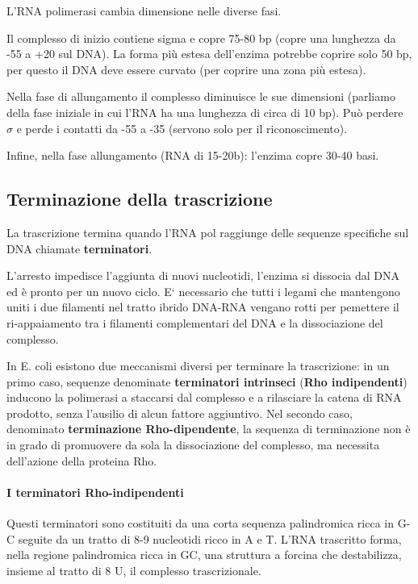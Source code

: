 \documentclass[11pt]{book}
\begin{document}
L'RNA polimerasi cambia dimensione nelle diverse fasi.

Il complesso di inizio contiene sigma e copre 75-80 bp (copre una
lunghezza da -55 a +20 sul DNA). La forma più estesa dell'enzima
potrebbe coprire solo 50 bp, per questo il DNA deve essere curvato (per
coprire una zona più estesa).

Nella fase di allungamento il complesso diminuisce le sue dimensioni
(parliamo della fase iniziale in cui l'RNA ha una lunghezza di circa di
10 bp). Può perdere \(\sigma\) e perde i contatti da -55 a -35 (servono
solo per il riconoscimento).

Infine, nella fase allungamento (RNA di 15-20b): l'enzima copre 30-40
basi.

\subsection{Terminazione della
trascrizione}\label{terminazione-della-trascrizione}

La trascrizione termina quando l'RNA pol raggiunge delle sequenze
specifiche sul DNA chiamate \textbf{terminatori}.

L'arresto impedisce l'aggiunta di nuovi nucleotidi, l'enzima si dissocia
dal DNA ed è pronto per un nuovo ciclo. E` necessario che tutti i legami
che mantengono uniti i due filamenti nel tratto ibrido DNA-RNA vengano
rotti per pemettere il ri-appaiamento tra i filamenti complementari del
DNA e la dissociazione del complesso.

In E. coli esistono due meccanismi diversi per terminare la
trascrizione: in un primo caso, sequenze denominate \textbf{terminatori
intrinseci} (\textbf{Rho indipendenti}) inducono la polimerasi a
staccarsi dal complesso e a rilasciare la catena di RNA prodotto, senza
l'ausilio di alcun fattore aggiuntivo. Nel secondo caso, denominato
\textbf{terminazione Rho-dipendente}, la sequenza di terminazione non è
in grado di promuovere da sola la dissociazione del complesso, ma
necessita dell'azione della proteina Rho.

\paragraph{I terminatori
Rho-indipendenti}\label{i-terminatori-rho-indipendenti}

Questi terminatori sono costituiti da una corta sequenza palindromica
ricca in G-C seguite da un tratto di 8-9 nucleotidi ricco in A e T.
L'RNA trascritto forma, nella regione palindromica ricca in GC, una
struttura a forcina che destabilizza, insieme al tratto di 8 U, il
complesso trascrizionale.
\end{document}
